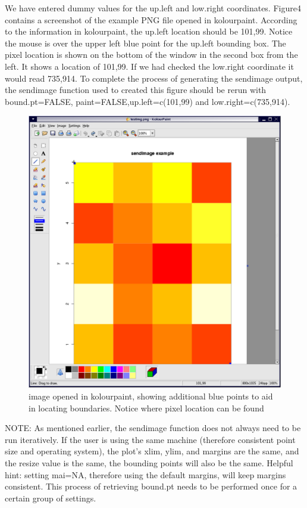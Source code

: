 \documentclass[]{article}
\begin{document}
We have entered dummy values for the up.left and low.right coordinates. Figure4 contains a screenshot of the example PNG file opened in kolourpaint. According to the information in kolourpaint, the up.left location should be 101,99. Notice the mouse is over the upper left blue point for the up.left bounding box. The pixel location is shown on the bottom of the window in the second box from the left. It shows a location of 101,99. If we had checked the low.right coordinate it would read 735,914. To complete the process of generating the sendimage output, the sendimage function used to created this figure should be rerun with bound.pt=FALSE, paint=FALSE,up.left=c(101,99) and low.right=c(735,914). \newline

\begin{center}
\begin{figure}
\includegraphics{imagePaint}
\caption{image opened in kolourpaint, showing additional blue points to aid in locating boundaries. Notice where pixel location can be found}
\end{figure}
\end{center}

NOTE: As mentioned earlier, the sendimage function does not always need to be run iteratively. If the user is using the same machine (therefore consistent point size and operating system), the plot's xlim, ylim, and margins are the same, and the resize value is the same, the bounding points will also be the same. Helpful hint: setting mai=NA, therefore using the default margins, will keep margins consistent. This process of retrieving bound.pt needs to be performed once for a certain group of settings.\newline
\\
\end{document}
